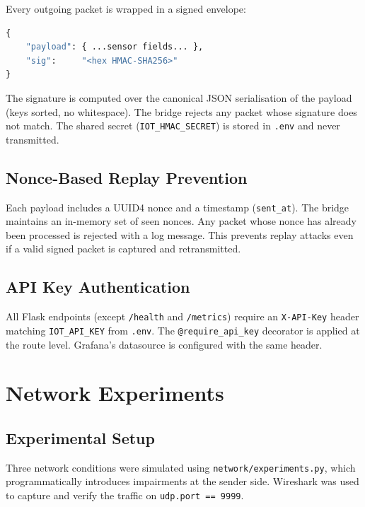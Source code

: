 \documentclass[12pt, a4paper]{article}
\begin{document}
Every outgoing packet is wrapped in a signed envelope:

\begin{lstlisting}[language=Python, caption={HMAC envelope structure}]
{
    "payload": { ...sensor fields... },
    "sig":     "<hex HMAC-SHA256>"
}
\end{lstlisting}

The signature is computed over the canonical JSON serialisation of the payload
(keys sorted, no whitespace). The bridge rejects any packet whose signature
does not match. The shared secret (\texttt{IOT\_HMAC\_SECRET}) is stored in
\texttt{.env} and never transmitted.

\subsection{Nonce-Based Replay Prevention}

Each payload includes a UUID4 nonce and a timestamp (\texttt{sent\_at}).
The bridge maintains an in-memory set of seen nonces. Any packet whose nonce
has already been processed is rejected with a log message. This prevents
replay attacks even if a valid signed packet is captured and retransmitted.

\subsection{API Key Authentication}

All Flask endpoints (except \texttt{/health} and \texttt{/metrics}) require
an \texttt{X-API-Key} header matching \texttt{IOT\_API\_KEY} from \texttt{.env}.
The \texttt{@require\_api\_key} decorator is applied at the route level.
Grafana's datasource is configured with the same header.

\section{Network Experiments}
\label{sec:experiments}

\subsection{Experimental Setup}

Three network conditions were simulated using \texttt{network/experiments.py},
which programmatically introduces impairments at the sender side. Wireshark
was used to capture and verify the traffic on \texttt{udp.port == 9999}.
\end{document}
